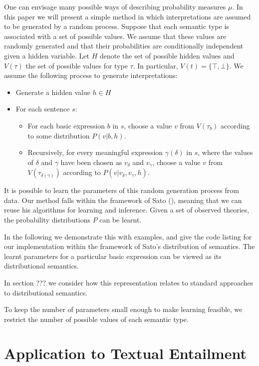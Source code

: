 \documentclass[letterpaper]{article}
\begin{document}
One can envisage many possible ways of describing probability measures
$\mu$. In this paper we will present a simple method in which
interpretations are assumed to be generated by a random process. Suppose that each semantic type is associated with a set of possible values. 
We assume that these values are randomly generated and that their
probabilities are conditionally independent given a hidden
variable. Let $H$ denote the set of possible hidden values and $V(\tau)$  the
set of possible values for type $\tau$. In particular, $V(t) = \{\top, \bot\}$. We assume the following process to generate
interpretations:
\begin{itemize}
\item Generate a hidden value $h\in H$
\item For each sentence $s$:
\begin{itemize}
\item For each basic expression $b$ in $s$, choose a value $v$ from
  $V(\tau_b)$ according to some distribution $P(v|b,h)$.
\item Recursively, for every meaningful expression $\gamma(\delta)$ in
  $s$, where the values of $\delta$ and $\gamma$ have been chosen as
  $v_\delta$ and $v_\gamma$, choose a value $v$ from
  $V(\tau_{\delta(\gamma)})$ according to $P(v|v_\delta, v_\gamma,
  h)$.
\end{itemize}
\end{itemize}

It is possible to learn the parameters of this random
generation process from data.  Our method falls within the framework of
Sato (\citeyear{Sato:95}), meaning that we can reuse his algorithms
for learning and inference. Given a set of observed theories, the probability distributions $P$
can be learnt. 

In the following we demonstrate this with
examples, and give the code listing for our implementation within the framework of Sato's distribution of semantics. The learnt parameters for a particular basic
expression can be viewed as its distributional semantics. 

In section ??? we consider how this representation relates to standard
approaches to distributional semantics.



To keep the number of parameters small enough to make learning
feasible, we restrict the number of possible values of each semantic
type.

\section{Application to Textual Entailment}
\end{document}
